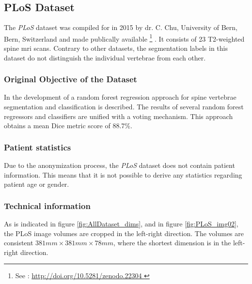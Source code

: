 \subsection{PLoS Dataset}

The \textit{PLoS} dataset was compiled for \cite{Chu2015} in 2015 by dr. C. Chu, University of Bern, Bern, Switzerland and made publically available \footnote{See : \url{ http://doi.org/10.5281/zenodo.22304 }} .
It consists of 23 T2-weighted spine \acrshort{mri} scans. 
Contrary to other datasets, the segmentation labels in this dataset do not distinguish the individual vertebrae from each other.

\subsubsection{Original Objective of the Dataset}

In \cite{Chu2015} the development of a random forest regression approach for spine vertebrae segmentation and classification is described.
The results of several random forest regressors and classifiers are unified with a voting mechanism.
This approach obtains a mean Dice metric score of 88.7\%.

\subsubsection{Patient statistics}

Due to the anonymization process, the \textit{PLoS} dataset does not contain patient information.
This means that it is not possible to derive any statistics regarding patient age or gender.

\subsubsection{Technical information}

As is indicated in figure \ref{fig:AllDataset_dims}, and in figure \ref{fig:PLoS_img02}, the PLoS image volumes are cropped in the left-right direction.
The volumes are consistent $381mm \times 381 mm \times 78 mm$, where the shortest dimension is in the left-right direction.

